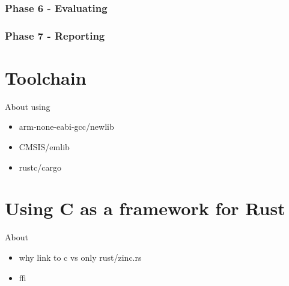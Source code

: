 \subsubsection{Phase 6 - Evaluating}
\subsubsection{Phase 7 - Reporting}

\section{Toolchain}

About using
\begin{itemize}
 \item arm-none-eabi-gcc/newlib
 \item CMSIS/emlib
 \item rustc/cargo
\end{itemize}

\section{Using C as a framework for Rust}

About
\begin{itemize}
 \item why link to c vs only rust/zinc.rs
 \item ffi
\end{itemize}
